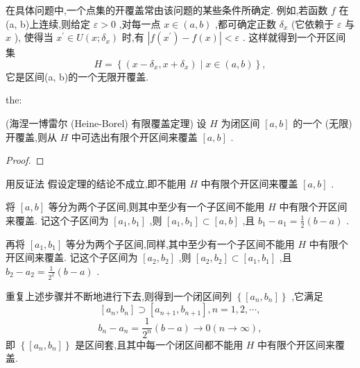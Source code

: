 在具体问题中,一个点集的开覆盖常由该问题的某些条件所确定. 例如,若函数 \(f\) 在(a, b)上连续,则给定 \(\varepsilon  > 0\) ,对每一点 \(x \in  \left( {a,b}\right)\) ,都可确定正数 \({\delta }_{x}\) (它依赖于 \(\varepsilon\) 与 \(x\) ), 使得当 \({x}^{\prime } \in  U\left( {x;{\delta }_{x}}\right)\) 时,有 \(\left| {f\left( {x}^{\prime }\right)  - f\left( x\right) }\right|  < \varepsilon\) . 这样就得到一个开区间集
\[
H = \left\{  {\left( {x - {\delta }_{x},x + {\delta }_{x}}\right)  \mid  x \in  \left( {a,b}\right) }\right\}  ,
\]
它是区间(a, b)的一个无限开覆盖.

\begin{theorem}{}{the:}

\end{theorem}
 (海涅一博雷尔 (Heine-Borel) 有限覆盖定理) 设 \(H\) 为闭区间 \(\left\lbrack  {a,b}\right\rbrack\) 的一个 (无限) 开覆盖,则从 \(H\) 中可选出有限个开区间来覆盖 \(\left\lbrack  {a,b}\right\rbrack\) .

\begin{proof}

\end{proof}
用反证法 假设定理的结论不成立,即不能用 \(H\) 中有限个开区间来覆盖 \(\left\lbrack  {a,b}\right\rbrack\) .

将 \(\left\lbrack  {a,b}\right\rbrack\) 等分为两个子区间,则其中至少有一个子区间不能用 \(H\) 中有限个开区间来覆盖. 记这个子区间为 \(\left\lbrack  {{a}_{1},{b}_{1}}\right\rbrack\) ,则 \(\left\lbrack  {{a}_{1},{b}_{1}}\right\rbrack   \subset  \left\lbrack  {a,b}\right\rbrack\) ,且 \({b}_{1} - {a}_{1} = \frac{1}{2}\left( {b - a}\right)\) .

再将 \(\left\lbrack  {{a}_{1},{b}_{1}}\right\rbrack\) 等分为两个子区间,同样,其中至少有一个子区间不能用 \(H\) 中有限个开区间来覆盖. 记这个子区间为 \(\left\lbrack  {{a}_{2},{b}_{2}}\right\rbrack\) ,则 \(\left\lbrack  {{a}_{2},{b}_{2}}\right\rbrack   \subset  \left\lbrack  {{a}_{1},{b}_{1}}\right\rbrack\) ,且 \({b}_{2} - {a}_{2} = \frac{1}{{2}^{2}}\left( {b - a}\right)\) .

重复上述步骤并不断地进行下去,则得到一个闭区间列 \(\left\{  \left\lbrack  {{a}_{n},{b}_{n}}\right\rbrack  \right\}\) ,它满足
\[
\left\lbrack  {{a}_{n},{b}_{n}}\right\rbrack   \supset  \left\lbrack  {{a}_{n + 1},{b}_{n + 1}}\right\rbrack  ,n = 1,2,\cdots ,
\]
\[
{b}_{n} - {a}_{n} = \frac{1}{{2}^{n}}\left( {b - a}\right)  \rightarrow  0\left( {n \rightarrow  \infty }\right) ,
\]
即 \(\left\{  \left\lbrack  {{a}_{n},{b}_{n}}\right\rbrack  \right\}\) 是区间套,且其中每一个闭区间都不能用 \(H\) 中有限个开区间来覆盖.

